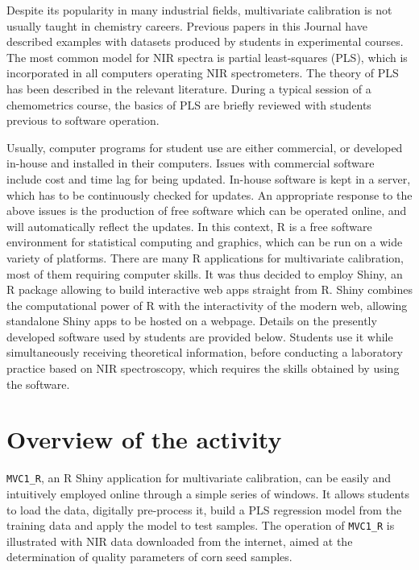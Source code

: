 \documentclass[10pt,twocolumn]{article}
\begin{document}
Despite its popularity in many industrial fields,\cite{olivieri18}
multivariate calibration is not usually taught in chemistry careers. Previous
papers in this Journal have described examples with datasets produced by
students in experimental courses.\cite{ribone00}\cite{oliveira12} The most
common model for NIR spectra is partial least-squares (PLS),\cite{wold01} which
is incorporated in all computers operating NIR spectrometers. The theory of PLS
has been described in the relevant literature.\cite{wold01} During a typical
session of a chemometrics course, the basics of PLS are briefly reviewed with
students previous to software operation.

Usually, computer programs for student use are either
commercial,\cite{oliveira12} or developed in-house and installed in their
computers.\cite{ribone00} Issues with commercial software include cost and time
lag for being updated. In-house software is kept in a server, which has to be
continuously checked for updates. An appropriate response to the above issues
is the production of free software which can be operated online, and will
automatically reflect the updates. In this context, R is a free software
environment for statistical computing and graphics,\cite{crawley13} which can
be run on a wide variety of platforms. There are many R applications for
multivariate calibration, most of them requiring computer skills.\cite{mevik07}
It was thus decided to employ Shiny, an R package allowing to build interactive
web apps straight from R.\cite{beeley13} Shiny combines the computational power
of R with the interactivity of the modern web, allowing standalone Shiny apps
to be hosted on a webpage. Details on the presently developed software used by
students are provided below. Students use it while simultaneously receiving
theoretical information, before conducting a laboratory practice based on NIR
spectroscopy, which requires the skills obtained by using the software.

\section*{Overview of the activity}
\texttt{MVC1\_R}, an R Shiny application for multivariate calibration, can be
easily and intuitively employed online through a simple series of windows. It
allows students to load the data, digitally pre-process it, build a PLS
regression model from the training data and apply the model to test samples.
The operation of \texttt{MVC1\_R} is illustrated with NIR data downloaded from
the internet, aimed at the determination of quality parameters of corn seed
samples. 
\end{document}
